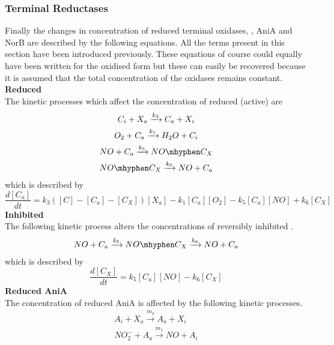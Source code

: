\subsubsection{Terminal Reductases}
Finally the changes in concentration of reduced terminal oxidases, \cbbthree{}, AniA and NorB are described by the following equations. All the terms present in this section have been introduced previously. These equations of course could equally have been written for the oxidised form but these can easily be recovered because it is assumed that the total concentration of the oxidases remains constant.\\
{\bf Reduced \cbbthree{}}\\
The kinetic processes which affect the concentration of reduced (active) \cbbthree{} are
\begin{equation*}
\begin{gathered}
C_i + X_a \xrightarrow{k_3} C_a + X_i\\
O_2 + C_a\xrightarrow{k_1} H_{2}O + C_i\\
NO + C_a \xrightarrow{k_5} NO\mhyphen C_X\\
NO\mhyphen C_X \xrightarrow{k_5} NO + C_a
\end{gathered}
\end{equation*}
which is described by
\begin{equation}
\frac{d[C_a]}{dt} = k_3([C] - [C_a] - [C_X])[X_a] - k_{1}[C_a][O_2] - k_5[C_a][NO] + k_6[C_X]
\label{eq:active_cbb3}
\end{equation}
{\bf Inhibited \cbbthree{}}\\
The following kinetic process alters the concentrations of reversibly inhibited \cbbthree{}.
\begin{equation*}
\begin{gathered}
 NO + C_a \xrightarrow{k_5} NO\mhyphen C_X \xrightarrow{k_6} NO + C_a
\end{gathered}
\end{equation*}
which is described by
\begin{equation}
\frac{d[C_X]}{dt} = k_5[C_a][NO] - k_6 [C_X]
\label{eq:NO inhibited_cbb3}
\end{equation}
{\bf Reduced AniA}\\
The concentration of reduced AniA is affected by the following kinetic processes.
\begin{equation*}
\begin{gathered}
A_i + X_a \xrightarrow{m_3} A_a + X_i \\
NO_2^- + A_a \xrightarrow{m_1} NO + A_i
\end{gathered}
\end{equation*}
